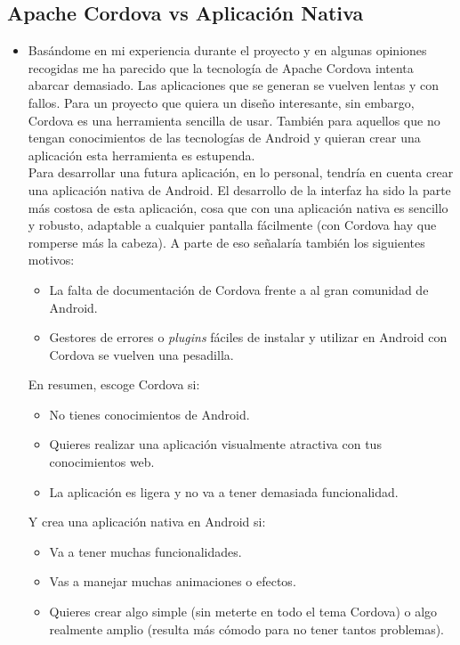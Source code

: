 \subsection*{Apache Cordova vs Aplicación Nativa}
\begin{itemize}
\item Basándome en mi experiencia durante el proyecto y en algunas opiniones recogidas me ha parecido que la tecnología de Apache Cordova intenta abarcar demasiado. Las aplicaciones que se generan se vuelven lentas y con fallos. Para un proyecto que quiera un diseño interesante, sin embargo, Cordova es una herramienta sencilla de usar. También para aquellos que no tengan conocimientos de las tecnologías de Android y quieran crear una aplicación esta herramienta es estupenda.\\

Para desarrollar una futura aplicación, en lo personal, tendría en cuenta crear una aplicación nativa de Android. El desarrollo de la interfaz ha sido la parte más costosa de esta aplicación, cosa que con una aplicación nativa es sencillo y robusto, adaptable a cualquier pantalla fácilmente (con Cordova hay que romperse más la cabeza). A parte de eso señalaría también los siguientes motivos:
\begin{itemize}
\item La falta de documentación de Cordova frente a al gran comunidad de Android.
\item Gestores de errores o \textit{plugins} fáciles de instalar y utilizar en Android con Cordova se vuelven una pesadilla.
\end{itemize}
En resumen, escoge Cordova si:
\begin{itemize}
\item No tienes conocimientos de Android.
\item Quieres realizar una aplicación visualmente atractiva con tus conocimientos web.
\item La aplicación es ligera y no va a tener demasiada funcionalidad.
\end{itemize}
Y crea una aplicación nativa en Android si:
\begin{itemize}
\item Va a tener muchas funcionalidades.
\item Vas a manejar muchas animaciones o efectos.
\item Quieres crear algo simple (sin meterte en todo el tema Cordova) o algo realmente amplio (resulta más cómodo para no tener tantos problemas).
\end{itemize}
\end{itemize}

